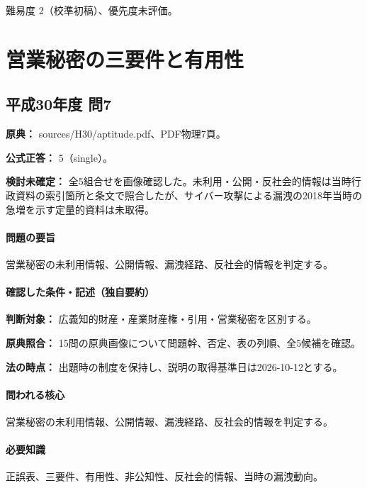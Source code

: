 \par 難易度 2（校準初稿）、優先度未評価。

\section{営業秘密の三要件と有用性}

\subsection{平成30年度 問7}
\label{q:h30-reg-apt-07}

\noindent\textbf{原典：} sources/H30/aptitude.pdf、PDF物理7頁。

\textbf{公式正答：} 5（single）。

\par\textbf{検討未確定：} 全5組合せを画像確認した。未利用・公開・反社会的情報は当時行政資料の索引箇所と条文で照合したが、サイバー攻撃による漏洩の2018年当時の急増を示す定量的資料は未取得。

\paragraph{問題の要旨} 営業秘密の未利用情報、公開情報、漏洩経路、反社会的情報を判定する。

\paragraph{確認した条件・記述（独自要約）}\mbox{}\par

\noindent\textbf{判断対象：} 広義知的財産・産業財産権・引用・営業秘密を区別する。\par

\noindent\textbf{原典照合：} 15問の原典画像について問題幹、否定、表の列順、全5候補を確認。\par

\noindent\textbf{法の時点：} 出題時の制度を保持し、説明の取得基準日は2026-10-12とする。\par

\paragraph{問われる核心} 営業秘密の未利用情報、公開情報、漏洩経路、反社会的情報を判定する。

\paragraph{必要知識} 正誤表、三要件、有用性、非公知性、反社会的情報、当時の漏洩動向。

